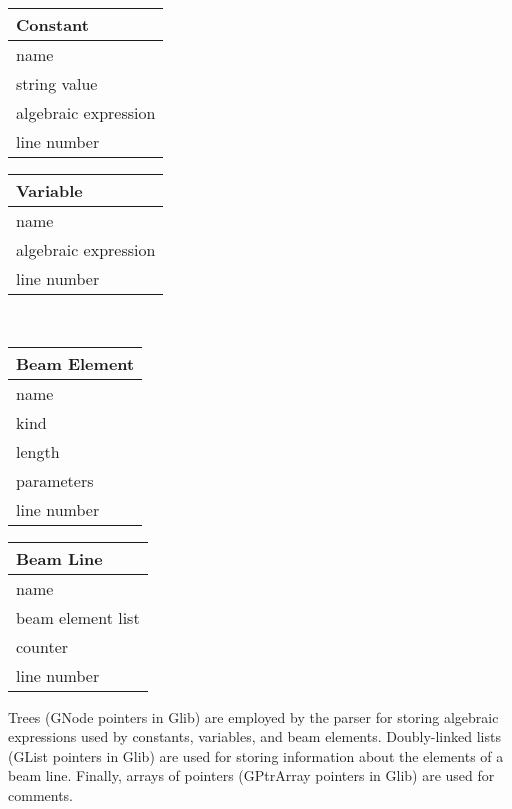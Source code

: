 \documentclass[12pt]{article}
\begin{document}
\begin{center}
\begin{tabular}{||l||}\hline\hline
Constant             \\ \hline
name                 \\
string value         \\
algebraic expression \\
line number          \\ \hline\hline
\end{tabular}
\hspace{2em}
\begin{tabular}{||l||}\hline\hline
Variable             \\ \hline
name                 \\
algebraic expression \\
line number          \\ \hline\hline
\end{tabular}
\\
\vspace{2em}
\begin{tabular}{||l||}\hline\hline
Beam Element \\ \hline
name         \\
kind         \\
length       \\
parameters   \\
line number  \\ \hline\hline
\end{tabular}
\hspace{2em}
\begin{tabular}{||l||}\hline\hline
Beam Line         \\ \hline
name              \\
beam element list \\
counter           \\
line number       \\ \hline\hline
\end{tabular}
\end{center}

Trees (GNode pointers in Glib) are employed by the parser for storing
algebraic expressions used by constants, variables, and beam elements.
Doubly-linked lists (GList pointers in Glib) are used for storing
information about the elements of a beam line. Finally, arrays of pointers
(GPtrArray pointers in Glib) are used for comments.
\end{document}
